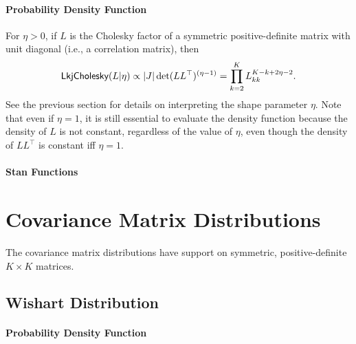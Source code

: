 \subsubsection{Probability Density Function}

For $\eta > 0$, if $L$ is the Cholesky factor of a symmetric
positive-definite matrix with unit diagonal (i.e., a correlation
matrix), then
\[
\distro{LkjCholesky}(L|\eta) 
\propto \left|J\right|\det(L L^\top)^{(\eta - 1)} 
= \prod_{k=2}^K L_{kk}^{K-k+2\eta-2}.
\]
See the previous section for details on interpreting the shape
parameter $\eta$. Note that even if $\eta=1$, it is still essential to
evaluate the density function because the density of $L$ is not
constant, regardless of the value of $\eta$, even though the density of
$LL^\top$ is constant iff $\eta=1$.


\subsubsection{Stan Functions}

\begin{description}
%
%
\end{description}
\begin{description}
\end{description}




\chapter{Covariance Matrix Distributions}

\noindent
The covariance matrix distributions have support on symmetric,
positive-definite $K \times K$ matrices.


\section{Wishart Distribution}

\subsubsection{Probability Density Function}

